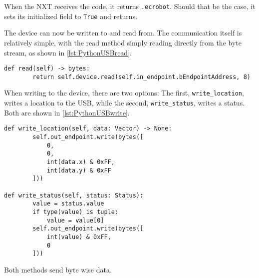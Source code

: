 When the NXT receives the code, it returns \texttt{{.}ecrobot}.
Should that be the case, it sets its initialized field to \texttt{True} and returns.

The device can now be written to and read from.
The communication itself is relatively simple, with the read method simply reading directly from the byte stream, as shown in \autoref{lst:PythonUSBread}.

\begin{lstlisting}[label={lst:PythonUSBread},caption={Reading from the USB port connected to the NXT}]
def read(self) -> bytes:
        return self.device.read(self.in_endpoint.bEndpointAddress, 8)
\end{lstlisting}

When writing to the device, there are two options:
The first, \texttt{write\_location}, writes a location to the USB, while the second,  \texttt{write\_status}, writes a status.
Both are shown in \autoref{lst:PythonUSBwrite}.

\begin{lstlisting}[label={lst:PythonUSBwrite},caption={Reading from the USB port connected to the NXT}]
def write_location(self, data: Vector) -> None:
        self.out_endpoint.write(bytes([
            0,
            0,
            int(data.x) & 0xFF,
            int(data.y) & 0xFF
        ]))

def write_status(self, status: Status):
        value = status.value
        if type(value) is tuple:
            value = value[0]
        self.out_endpoint.write(bytes([
            int(value) & 0xFF,
            0
        ]))

\end{lstlisting}
Both methods send byte wise data.
